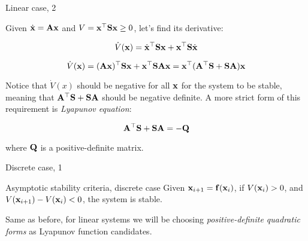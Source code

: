 \documentclass{beamer}
\begin{document}
\begin{frame}{Linear case, 2}
\begin{flushleft}

Given $\dot{\mathbf{x}} = \mathbf{A}\mathbf{x}$ and $V = \mathbf{x}^\top\mathbf{S}\mathbf{x} \geq 0$, let's find its derivative:

\begin{equation}
    \dot V(\mathbf{x}) = \dot{\mathbf{x}}^\top\mathbf{S}\mathbf{x} + 
    \mathbf{x}^\top\mathbf{S}\dot{\mathbf{x}}
\end{equation}

\begin{equation}
    \dot V(\mathbf{x}) = (\mathbf{A}\mathbf{x})^\top\mathbf{S}\mathbf{x} + 
    \mathbf{x}^\top\mathbf{S}\mathbf{A}\mathbf{x} = 
    \mathbf{x}^\top(\mathbf{A}^\top\mathbf{S} + \mathbf{S}\mathbf{A})\mathbf{x}
\end{equation}

Notice that $\dot V(x)$ should be negative for all $\mathbf{x}$ for the system to be stable, meaning that $\mathbf{A}^\top\mathbf{S} + \mathbf{S}\mathbf{A}$ should be negative definite. A more strict form of this requirement is \emph{Lyapunov equation}:

\begin{equation}
    \mathbf{A}^\top\mathbf{S} + \mathbf{S}\mathbf{A} = -\mathbf{Q}
\end{equation}

where $\mathbf{Q}$ is a positive-definite matrix.

\end{flushleft}
\end{frame}



\begin{frame}{Discrete case, 1}
\begin{flushleft}

\begin{block}{Asymptotic stability criteria, discrete case}
Given $\mathbf{x}_{i+1} = \mathbf{f}(\mathbf{x}_i)$, if $V(\mathbf{x}_i) > 0$, and $V(\mathbf{x}_{i+1}) - V(\mathbf{x}_i) < 0$, the system is stable.
\end{block}

\bigskip 

Same as before, for linear systems we will be choosing \emph{positive-definite quadratic forms} as Lyapunov function candidates.

\end{flushleft}
\end{frame}
\end{document}
